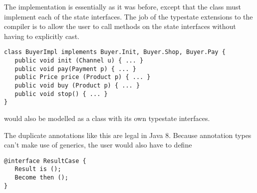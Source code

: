 \noindent The implementation is essentially as it was before, except
that the class  must implement each of the state
interfaces. The job of the typestate extensions to the compiler is to
allow the user to call methods on the state interfaces without having
to explicitly cast.

\begin{lstlisting}
class BuyerImpl implements Buyer.Init, Buyer.Shop, Buyer.Pay {
   public void init (Channel u) { ... }
   public void pay(Payment p) { ... }
   public Price price (Product p) { ... }
   public void buy (Product p) { ... }
   public void stop() { ... }
}
\end{lstlisting}

\noindent {} would also be modelled as a class with its own
typestate interfaces.

\noindent The duplicate annotations like this are legal in Java 8.
Because annotation types can't make use of generics, the user would
also have to define
\begin{lstlisting}
@interface ResultCase {
   Result is ();
   Become then ();
}
\end{lstlisting}
